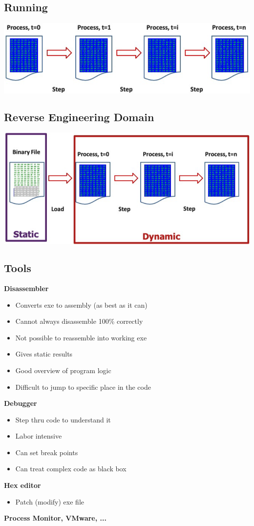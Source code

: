 \subsection{Running}
\includegraphics[width=\linewidth]{../img/running.png}

\subsection{Reverse Engineering Domain}
\includegraphics[width=\linewidth]{../img/reverse_engineering_domain.png}

\subsection{Tools}
\textbf{Disassembler}
\begin{itemize}
    \item Converts exe to assembly (as best as it can)
    \item Cannot always disassemble 100\% correctly
    \item Not possible to reassemble into working exe
    \item Gives static results
    \item Good overview of program logic
    \item Difficult to jump to specific place in the code
\end{itemize}
\textbf{Debugger}
\begin{itemize}
    \item Step thru code to understand it
    \item Labor intensive
    \item Can set break points
    \item Can treat complex code as black box
\end{itemize}
\textbf{Hex editor}
\begin{itemize}
    \item Patch (modify) exe file
\end{itemize}
\textbf{Process Monitor, VMware, ...}

